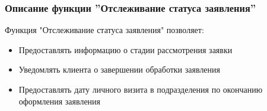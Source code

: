 \documentclass[russian, utf8, 12pt,pointsubsection,floatsubsection]{eskdtext}
\begin{document}
\subsubsection{Описание функции ''Отслеживание статуса заявления''}
Функция "Отслеживание статуса заявления" позволяет:
\begin{itemize}
    \item Предоставлять информацию о стадии рассмотрения заявки
    \item Уведомлять клиента о завершении обработки заявления
    \item Предоставлять дату личного визита в подразделения по окончанию оформления заявления
\end{itemize}
\end{document}
